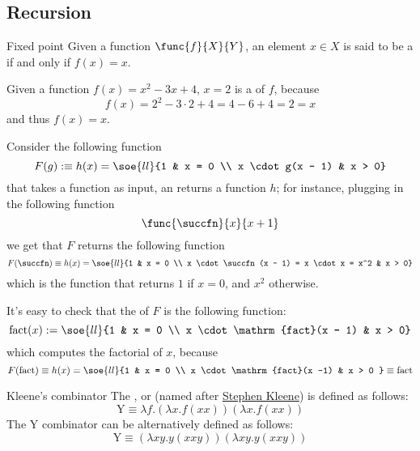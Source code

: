 \documentclass[a4paper, 12pt]{report}
\begin{document}
    \subsection{Recursion}

    \begin{frameddefn}{Fixed point}
        Given a function $\func{f}{X}{Y}$, an element $x \in X$ is said to be a  if and only if $f(x) = x$.
    \end{frameddefn}

    \begin{example}
        Given a function $f(x) = x^2 - 3x + 4$, $x = 2$ is a  of $f$, because $$f(x) = 2^2 - 3 \cdot 2 + 4 = 4 - 6 + 4 = 2 = x$$ and thus $f(x) = x$.
    \end{example}

    \begin{example}
        Consider the following function $$F(g) :\equiv h(x) = \soe{ll}{1 & x = 0 \\ x \cdot g(x - 1) & x > 0}$$ that takes a function as input, an returns a function $h$; for instance, plugging in the following function $$\func{\succfn}{x}{x + 1}$$ we get that $F$ returns the following function $$F(\succfn) \equiv h(x) = \soe{ll}{1 & x = 0 \\ x \cdot \succfn(x - 1) = x \cdot x = x^2 & x > 0}$$ which is the function that returns $1$ if $x = 0$, and $x^2$ otherwise.

        It's easy to check that the  of $F$ is the following function: $$\mathrm{fact}(x) := \soe{ll}{1 & x = 0 \\ x \cdot \mathrm{fact}(x - 1) & x > 0}$$ which computes the factorial of $x$, because $$F(\mathrm{fact}) \equiv h(x) = \soe{ll}{1 & x = 0 \\ x \cdot \mathrm{fact}(x -1) & x > 0 } \equiv \mathrm{fact}$$
    \end{example}

    \begin{frameddefn}{Kleene's combinator}
        The ,  or  (named after \href{https://it.wikipedia.org/wiki/Stephen_Kleene}{Stephen Kleene}) is defined as follows: $$\mathrm Y \equiv \lambda f.(\lambda x.f(xx))(\lambda x.f(xx))$$ The $\mathrm Y$ combinator can be alternatively defined as follows: $$\mathrm Y \equiv (\lambda xy. y(xxy))(\lambda xy.y(xxy))$$
    \end{frameddefn}
\end{document}
